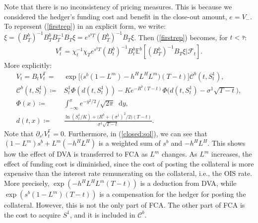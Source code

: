 \documentclass[a4paper, 11pt]{article}              %
\numberwithin{equation}{section}
\theoremstyle{plain}
\newcommand{\btau}{\bar{\tau}}
\newcommand{\1}{\mathds{1}}
\newcommand{\calF}{\mathcal{F}}
\newcommand{\calC}{\mathcal{C}}
\newcommand{\dsE}{\mathbb{E}}
\newcommand{\dsF}{\mathbb{F}}
\theoremstyle{plain}
\theoremstyle{definition}
\theoremstyle{plain}
\newcommand*\df{\mathop{}\!\mathrm{d}}
\begin{document}
Note that there is no inconsistency of pricing measures. This is because we
considered the hedger's funding cost and benefit in the close-out amount, 
$e=V_-$. To represent (\ref{firstrep}) in an explicit form, we write:
  $\xi = (B^b_T)^{-1}B^b_TB^{-1}_TB_T\xi =e^{s^b T}(B^b_T)^{-1}B_T\xi$. 
Then (\ref{firstrep}) becomes, for $t < \btau$:
\begin{align}
 V^\dsF_t = \chi_t^{-1}\chi_Te^{s^b
  T}(B^b_t)^{-1}B_t^b\dsE^b[(B^b_T)^{-1}B_T\xi|\calF_t].\nonumber 
\end{align}
More explicitly:
\begin{align}
  V_t=B_tV^\dsF_t   =&\exp{\big[ \big(s^b(1-L^m)-h^HL^HL^m  \big)(T-t)\big]}\calC^b(t, S^1_t),
  \label{closed:sol}\\ 
  \calC^b(t, S^1_t)\coloneqq& S^1_t\Phi(d(t, S^1_t))
                              -Ke^{-R^b(T-t)}\Phi\big(d(t, S^1_t)-\sigma^1\sqrt{T-t}\big),\\
  \Phi(x)\coloneqq&\int_{-\infty}^{x}e^{-y^2/2}/\sqrt{2\pi} \df y,\\
  d(t, x) \coloneqq& \frac{\ln{(S^1_t/K)} + \big(R^b +(\sigma^1)^2/2\big)(T-t)}{\sigma^1\sqrt{T-t}}.
\end{align}
Note that $\partial_{s^\ell}V_t^\dsF = 0$. Furthermore, in (\ref{closed:sol}), we can see that
  $(1-L^m)s^b+L^m(-h^HL^H)$ 
is a weighted sum of $s^b$ and $-h^HL^H$. This shows how the effect of DVA is
transferred to FCA as $L^m$ changes. As $L^m$ increases, the effect of funding
cost is diminished, since the cost of posting the collateral is more expensive than
the interest rate remunerating on the collateral, i.e.,  the OIS rate. More
precisely, 
  $\exp{(-h^HL^HL^m(T-t))}$ 
is a deduction from  DVA, while
  $\exp{(s^b(1-L^m)(T-t))}$
is a compensation for the hedger for  posting the collateral.  However, this is not
the only part of FCA. The other part of FCA is the cost to acquire $S^1$, and it is
included in $\calC^b$.
\end{document}
